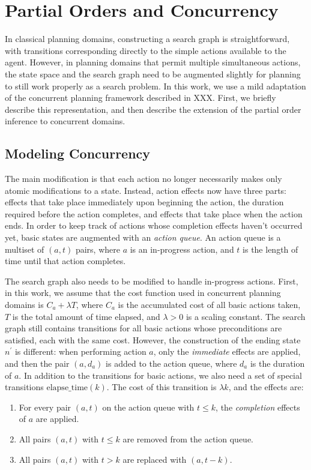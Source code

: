 \documentclass[letterpaper]{article}
\theoremstyle{plain} \newtheorem{theorem}{Theorem} \newtheorem{proposition}{Proposition} \newtheorem{lemma}{Lemma}
\theoremstyle{definition} \newtheorem{definition}{Definition} \newtheorem{conjecture}{Conjecture} \newtheorem*{example}{Example}
\theoremstyle{remark} \newtheorem*{remark}{Remark} \newtheorem*{note}{Note} \newtheorem{case}{Case}
\begin{document}
\section{Partial Orders and Concurrency} 

In classical planning domains, constructing a search graph is
straightforward, with transitions corresponding directly to the
simple actions available to the agent. However, in planning domains
that permit multiple simultaneous actions, the state space and the
search graph need to be augmented slightly for planning to still
work properly as a search problem. In this work, we use a mild
adaptation of the concurrent planning framework described in XXX.
First, we briefly describe this representation, and then describe
the extension of the partial order inference to concurrent domains.

\subsection{Modeling Concurrency}

The main modification is that each action no longer necessarily
makes only atomic modifications to a state. Instead, action effects
now have three parts: effects that take place immediately upon
beginning the action, the duration required before the action
completes, and effects that take place when the action ends. In
order to keep track of actions whose completion effects haven't
occurred yet, basic states are augmented with an \emph{action queue}.
An action queue is a multiset of $(a, t)$ pairs, where $a$ is an
in-progress action, and $t$ is the length of time until that action
completes.

The search graph also needs to be modified to handle in-progress actions. First, 
in this work, we assume that the cost function used in concurrent planning domains is
$C_a + \lambda T$, where $C_a$ is the accumulated cost of all basic actions taken, $T$ is
the total amount of time elapsed, and $\lambda > 0$ is a scaling constant. The search graph still contains transitions for all
basic actions whose preconditions are satisfied, each with the same cost. However, the
construction of the ending state $n^\prime$ is different: when performing action $a$, only the
\emph{immediate} effects are applied, and then the pair $(a, d_a)$ is added to the action
queue, where $d_a$ is the duration of $a$. 
In addition to the transitions for basic actions, we also need a set of special transitions
$\mathrm{elapse\_time}(k)$. The cost of this transition is $\lambda k$, and the effects are: 
\begin{enumerate}
	\item For every pair $(a, t)$ on the action queue with $t \le k$, the \emph{completion} effects of $a$ are applied.
	\item All pairs $(a, t)$ with $t \le k$ are removed from the action queue.
	\item All pairs $(a, t)$ with $t > k$ are replaced with $(a, t-k)$.
\end{enumerate}
\end{document}
